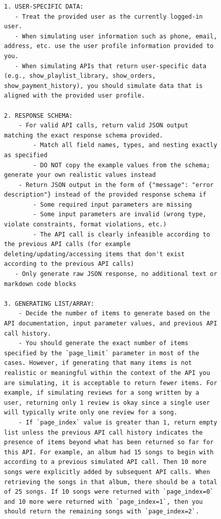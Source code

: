 \begin{figure}[t]
\begin{lstlisting}[style=prettyprompt, captionpos=b, caption={Simulation rules (1/2): user data, response schema, and list generation.}, label={lst:sim_rules_a}]
1. USER-SPECIFIC DATA:
   - Treat the provided user as the currently logged-in user.
   - When simulating user information such as phone, email, address, etc. use the user profile information provided to you.
   - When simulating APIs that return user-specific data (e.g., show_playlist_library, show_orders, show_payment_history), you should simulate data that is aligned with the provided user profile.

2. RESPONSE SCHEMA:
    - For valid API calls, return valid JSON output matching the exact response schema provided.
        - Match all field names, types, and nesting exactly as specified
        - DO NOT copy the example values from the schema; generate your own realistic values instead
    - Return JSON output in the form of {"message": "error description"} instead of the provided response schema if
        - Some required input parameters are missing
        - Some input parameters are invalid (wrong type, violate constraints, format violations, etc.)
        - The API call is clearly infeasible according to the previous API calls (for example deleting/updating/accessing items that don't exist according to the previous API calls)
   - Only generate raw JSON response, no additional text or markdown code blocks

3. GENERATING LIST/ARRAY:
    - Decide the number of items to generate based on the API documentation, input parameter values, and previous API call history.
    - You should generate the exact number of items specified by the `page_limit` parameter in most of the cases. However, if generating that many items is not realistic or meaningful within the context of the API you are simulating, it is acceptable to return fewer items. For example, if simulating reviews for a song written by a user, returning only 1 review is okay since a single user will typically write only one review for a song.
    - If `page_index` value is greater than 1, return empty list unless the previous API call history indicates the presence of items beyond what has been returned so far for this API. For example, an album had 15 songs to begin with according to a previous simulated API call. Then 10 more songs were explicitly added by subsequent API calls. When retrieving the songs in that album, there should be a total of 25 songs. If 10 songs were returned with `page_index=0` and 10 more were returned with `page_index=1`, then you should return the remaining songs with `page_index=2`.
\end{lstlisting}
\end{figure}


